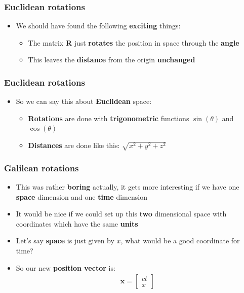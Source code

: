 \documentclass{beamer}
\begin{document}
\begin{frame}
  \frametitle{Euclidean rotations}
  \begin{itemize}
    \item<1-> We should have found the following \textbf{exciting} things:
      \begin{itemize}
	\item<2-> The matrix \textbf{R} just \textbf{rotates} the position in space through the \textbf{angle}
	\item<3-> This leaves the \textbf{distance} from the origin \textbf{unchanged}
      \end{itemize}
  \end{itemize}
\end{frame}

\begin{frame}
  \frametitle{Euclidean rotations}
  \begin{itemize}
    \item<1-> So we can say this about \textbf{Euclidean} space:
      \begin{itemize}
	\item<2-> \textbf{Rotations} are done with \textbf{trigonometric} functions $\sin(\theta)$ and $\cos(\theta)$
	\item<3-> \textbf{Distances} are done like this: $\sqrt{x^2+y^2+z^2}$
      \end{itemize}
  \end{itemize}
\end{frame}

\begin{frame}
  \frametitle{Galilean rotations}
  \begin{itemize}
    \item<1-> This was rather \textbf{boring} actually, it gets more interesting if we have one \textbf{space} dimension and one \textbf{time} dimension
    \item<2-> It would be nice if we could set up this \textbf{two} dimensional space with coordinates which have the same \textbf{units}
    \item<3-> Let's say \textbf{space} is just given by $x$, what would be a good coordinate for time?
    \item<4-> So our new \textbf{position vector} is:
      \begin{align*}
	\mathbf{x}=
	\begin{bmatrix}
	  ct\\
	  x
	\end{bmatrix}
      \end{align*}
  \end{itemize}
\end{frame}
\end{document}
